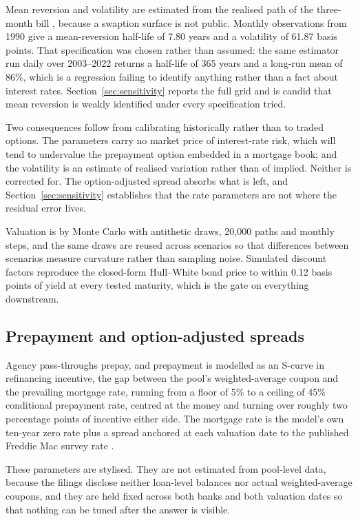 Mean reversion and volatility are estimated from the realised path of the three-month
bill \citep{FRED}, because a swaption surface is not public. Monthly observations from
1990 give a
mean-reversion half-life of 7.80 years and a volatility of 61.87 basis points. That
specification was chosen rather than assumed: the same estimator run daily over
2003--2022 returns a half-life of 365 years and a long-run mean of 86\%, which is a
regression failing to identify anything rather than a fact about interest rates.
Section~\ref{sec:sensitivity} reports the full grid and is candid that mean reversion
is weakly identified under every specification tried.

Two consequences follow from calibrating historically rather than to traded options.
The parameters carry no market price of interest-rate risk, which will tend to
undervalue the prepayment option embedded in a mortgage book; and the volatility is
an estimate of realised variation rather than of implied. Neither is corrected for.
The option-adjusted spread absorbs what is left, and
Section~\ref{sec:sensitivity} establishes that the rate parameters are not where the
residual error lives.

Valuation is by Monte Carlo with antithetic draws, 20,000 paths and monthly steps,
and the same draws are reused across scenarios so that differences between scenarios
measure curvature rather than sampling noise. Simulated discount factors reproduce
the closed-form Hull--White bond price to within 0.12 basis points of yield at every
tested maturity, which is the gate on everything downstream.

\subsection{Prepayment and option-adjusted spreads}

Agency pass-throughs prepay, and prepayment is modelled as an S-curve in refinancing
incentive, the gap between the pool's weighted-average coupon and the prevailing
mortgage rate, running from a floor of 5\% to a ceiling of 45\% conditional
prepayment rate, centred at the money and turning over roughly two percentage points
of incentive either side. The mortgage rate is the model's own ten-year zero rate plus
a spread anchored at each valuation date to the published Freddie Mac survey rate
\citep{FreddieMac}.

These parameters are stylised. They are not estimated from pool-level data, because
the filings disclose neither loan-level balances nor actual weighted-average coupons,
and they are held fixed across both banks and both valuation dates so that nothing can
be tuned after the answer is visible.

